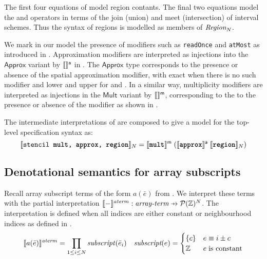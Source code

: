 The first four equations of  model region 
contants. The final two equations model the \term{+} and \term{*}
operators in terms of the join (union) and meet (intersection)
of interval schemes. Thus the syntax of regions is modelled as members 
of $\textnormal{$\textit{Region}_{N}$}$.

We mark in our model the presence of modifiers such as
\texttt{readOnce} and \texttt{atMost} as introduced in \Cref{}.
Approximation modifiers are interpreted as injections into the
$\mathsf{Approx}$ variant by $\llbracket{} {} \rrbracket{}^{\textsf{a}}$ in
.  The $\textsf{Approx}$ type corresponds
to the presence or absence of the spatial approximation modifier, with
\textsf{exact} when there is no such modifier and \textsf{lower} and
\textsf{upper} for  and . In a similar way,
multiplicity modifiers are interpreted as injections in the
$\mathsf{Mult}$ variant by $\llbracket{} {} \rrbracket{}^{\textsf{m}}$, corresponding to the to
the presence or absence of the  modifier as shown in
.

\begin{defn}
The intermediate interpretations of 
are composed to give a model for the top-level specification
syntax as:
%
\begin{equation*}
  \llbracket{} {\texttt{stencil \texttt{\textbf{mult}}, \texttt{\textbf{approx}}, \texttt{\textbf{region}}}} \rrbracket{}_N =
    \llbracket{} {\texttt{\textbf{mult}}} \rrbracket{}^{\textsf{m}} \;
           {(\llbracket{} {\texttt{\textbf{approx}}} \rrbracket{}^{\textsf{a}} \;
                    {\llbracket{} {\texttt{\textbf{region}}} \rrbracket{}_N)}}
\end{equation*}
\end{defn}

\subsection{Denotational semantics for array subscripts}
\label{sec:fromcode}

\begin{defn}
  Recall array subscript terms of the form $a(\bar{e})$ from
  . We interpret these terms with the partial
  interpretation $\interp{-}^{\mathit{aterm}} : \textit{array-term}
  \prightarrow{} \mathcal{P}(\bz{})^N$. The interpretation is defined when
  all indices are either constant or neighbourhood indices as defined in
  .
%
  \begin{align*}
    \llbracket{} {a(\bar{e})} \rrbracket{}^{\mathit{aterm}} =
      \prod_{1 \leq i \leq N} \mathit{subscript}(\bar{e}_i) & &
    \textit{subscript}(e) = \begin{cases}
      \{ c \} & e \equiv i \pm c \\
      \textnormal{$\mathbb{Z}$} & e \; \mbox{is constant}
    \end{cases}
  \end{align*}
\end{defn}

